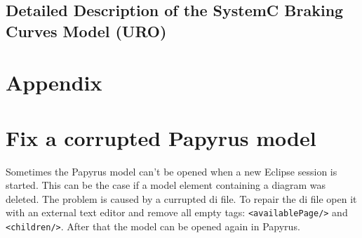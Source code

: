 \documentclass{template/openetcs_article}
\begin{document}
\subsection{Detailed Description of the SystemC Braking Curves Model (URO)}


\section*{Appendix}
\section*{Fix a corrupted Papyrus model}
Sometimes the Papyrus model can't be opened when a new Eclipse session is started. This can be the case if a model element containing a diagram was deleted. The problem is caused by a currupted di file. To repair the di file open it with an external text editor and remove all empty tags:  \verb|<availablePage/>| and \verb|<children/>|. After that the model can be opened again in Papyrus.




\end{document}

